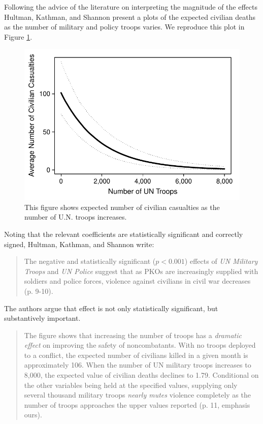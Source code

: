 \documentclass[12pt]{article}
\begin{document}
Following the advice of the literature on interpreting the magnitude of the effects Hultman, Kathman, and Shannon present a plots of the expected civilian deaths as the number of military and policy troops varies. We reproduce this plot in Figure \ref{fig:hks-ev}.

\begin{figure}[H]
\begin{center}
\includegraphics[scale = .8]{figs/hks-ev.pdf}
\caption{This figure shows expected number of civilian casualties as the number of U.N. troops increases.}\label{fig:hks-ev}
\end{center}
\end{figure}

Noting that the relevant coefficients are statistically significant and correctly signed, Hultman, Kathman, and Shannon write:

\begin{quote}
The negative and statistically significant ($p < 0.001$) effects of \textit{UN Military Troops} and \textit{UN Police} suggest that as PKOs are increasingly supplied with soldiers and police forces, violence against civilians in civil war decreases (p. 9-10).
\end{quote}

The authors argue that effect is not only statistically significant, but substantively important.

\begin{quote}
The figure shows that increasing the number of troops has a \emph{dramatic effect} on improving the safety of noncombatants. With no troops deployed to a conflict, the expected number of civilians killed in a given month is approximately 106. When the number of UN military troops increases to 8,000, the expected value of civilian deaths declines to 1.79. Conditional on the other variables being held at the specified values, supplying only several thousand military troops \emph{nearly mutes} violence completely as the number of troops approaches the upper values reported (p. 11, emphasis ours).
\end{quote}
\end{document}
